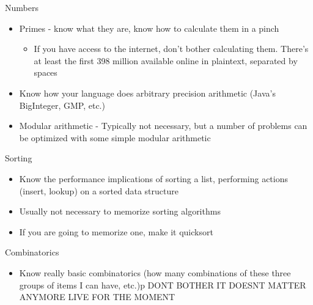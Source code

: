 \documentclass{beamer}
\begin{document}
\begin{frame}{Numbers}
  \begin{centering}
    \begin{itemize}
      \item Primes - know what they are, know how to calculate them in a pinch
      \begin{itemize}
        \item If you have access to the internet, don't bother calculating them. There's at least the first 398 million available online in plaintext, separated by spaces
      \end{itemize}
      \item Know how your language does arbitrary precision arithmetic (Java's BigInteger, GMP, etc.)
      \item Modular arithmetic - Typically not necessary, but a number of problems can be optimized with some simple modular arithmetic
    \end{itemize}
  \end{centering}
\end{frame}

\begin{frame}{Sorting}
  \begin{centering}
    \begin{itemize}
      \item Know the performance implications of sorting a list, performing actions (insert, lookup) on a sorted data structure
      \item Usually not necessary to memorize sorting algorithms
      \item If you are going to memorize one, make it quicksort
    \end{itemize}
  \end{centering}
\end{frame}

\begin{frame}{Combinatorics}
  \begin{centering}
    \begin{itemize}
      \item Know really basic combinatorics (how many combinations of these three groups of items I can have, etc.)p
      DONT BOTHER IT DOESNT MATTER ANYMORE
      LIVE FOR THE MOMENT
    \end{itemize}
  \end{centering}
\end{frame}
\end{document}
